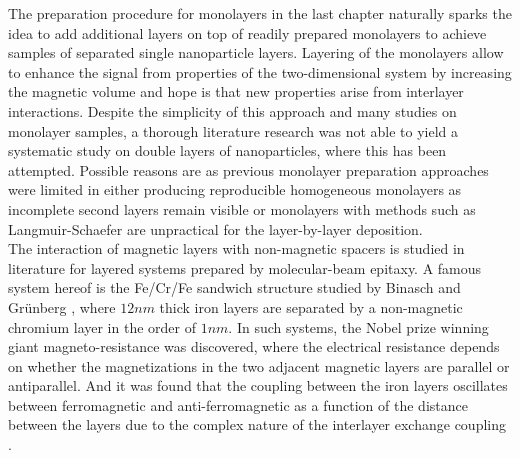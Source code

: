 \documentclass[\main/dresen_thesis.tex]{subfiles}
\begin{document}
  The preparation procedure for monolayers in the last chapter naturally sparks the idea to add additional layers on top of readily prepared monolayers to achieve samples of separated single nanoparticle layers.
  Layering of the monolayers allow to enhance the signal from properties of the two-dimensional system by increasing the magnetic volume and hope is that new properties arise from interlayer interactions.
  Despite the simplicity of this approach and many studies on monolayer samples, a thorough literature research was not able to yield a systematic study on double layers of nanoparticles, where this has been attempted.
  Possible reasons are as previous monolayer preparation approaches were limited in either producing reproducible homogeneous monolayers as incomplete second layers remain visible \cite{Mishra_2015_Polar, Bodnarchuk_2010_Large} or monolayers with methods such as Langmuir-Schaefer \cite{Ukleev_2017_Polar} are unpractical for the layer-by-layer deposition.
  \\

  The interaction of magnetic layers with non-magnetic spacers is studied in literature for layered systems prepared by molecular-beam epitaxy.
  A famous system hereof is the Fe/Cr/Fe sandwich structure studied by Binasch and Gr\"unberg \etal \cite{Binasch_1989_Enhan}, where $12 \unit{nm}$ thick iron layers are separated by a non-magnetic chromium layer in the order of  $1 \unit{nm}$.
  In such systems, the Nobel prize winning giant magneto-resistance was discovered, where the electrical resistance depends on whether the magnetizations in the two adjacent magnetic layers are parallel or antiparallel.
  And it was found that the coupling between the iron layers oscillates between ferromagnetic and anti-ferromagnetic as a function of the distance between the layers due to the complex nature of the interlayer exchange coupling \cite{Demokritov_1998_Biqua}.
\end{document}
